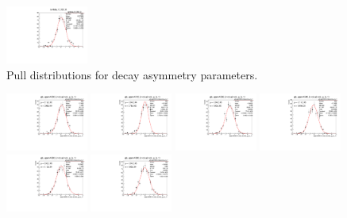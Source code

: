 \begin{figure}[h]
    \includegraphics[width=0.24\textwidth]{figure/io_wo_bkg/alpha/pull_alpha_lambda_K_892_0.pdf}
    \caption{Pull distributions for decay asymmetry parameters.}
\label{fig:io_wo_bkg_pull_asymmetry}
\end{figure}

\begin{figure}[h]\centering
    \includegraphics[width=0.24\textwidth]{figure/io_wo_bkg/gls/pull_gls_epem4600_Lmdc.aLmdc_g_ls_1r.pdf}
    \includegraphics[width=0.24\textwidth]{figure/io_wo_bkg/gls/pull_gls_epem4612_Lmdc.aLmdc_g_ls_1r.pdf}
    \includegraphics[width=0.24\textwidth]{figure/io_wo_bkg/gls/pull_gls_epem4626_Lmdc.aLmdc_g_ls_1r.pdf}
    \includegraphics[width=0.24\textwidth]{figure/io_wo_bkg/gls/pull_gls_epem4640_Lmdc.aLmdc_g_ls_1r.pdf}
    \includegraphics[width=0.24\textwidth]{figure/io_wo_bkg/gls/pull_gls_epem4660_Lmdc.aLmdc_g_ls_1r.pdf}
    \includegraphics[width=0.24\textwidth]{figure/io_wo_bkg/gls/pull_gls_epem4680_Lmdc.aLmdc_g_ls_1r.pdf}

\end{figure}
